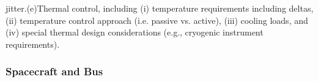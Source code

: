 \documentclass[12pt,journal]{IEEEtran}
\begin{document}
jitter.(e)Thermal control, including (i) temperature requirements including deltas, (ii) temperature control approach (i.e. passive vs. active), (iii) cooling loads, and (iv) special thermal design considerations (e.g., cryogenic instrument requirements).




\subsubsection{Spacecraft and Bus}


\end{document}
